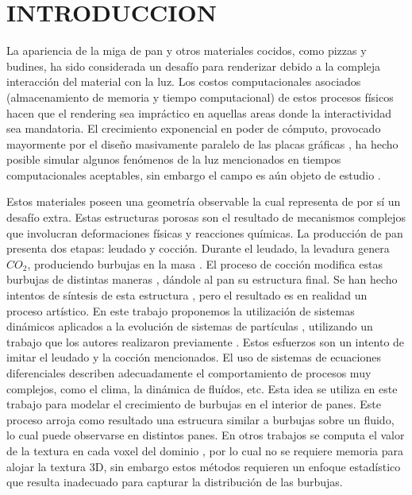\documentclass[oneside,a4paper,spanish,links]{amca}
\begin{document}
\section{INTRODUCCION}

La apariencia de la miga de pan y otros materiales cocidos, como pizzas y budines, ha sido considerada un desaf\'io para renderizar debido a la compleja interacci\'on del material con la luz. Los costos computacionales asociados (almacenamiento de memoria y tiempo computacional) de estos procesos f\'isicos hacen que el rendering sea impr\'actico en aquellas areas donde la interactividad sea mandatoria. El crecimiento exponencial en poder de c\'omputo, provocado mayormente por el dise\~no masivamente paralelo de las placas gr\'aficas \citep{Yeo09,Harris06}, ha hecho posible simular algunos fen\'omenos de la luz mencionados en tiempos computacionales aceptables, sin embargo el campo es a\'un objeto de estudio \citep{Voglsam2013}.

Estos materiales poseen una geometr\'ia observable la cual representa de por s\'i un desaf\'io extra. Estas estructuras porosas son el resultado de mecanismos complejos que involucran deformaciones f\'isicas y reacciones qu\'imicas. La producci\'on de pan presenta dos etapas: leudado y cocci\'on. Durante el leudado, la levadura genera $CO_{2}$, produciendo burbujas en la masa \citep{Shah1998}. El proceso de cocci\'on \citep{Mondal2008} modifica estas burbujas de distintas maneras \citep{Scanlon2001}, d\'andole al pan su estructura final. Se han hecho intentos de s\'intesis de esta estructura \citep{Cho2007}, pero el resultado es en realidad un proceso art\'istico. En este trabajo proponemos la utilizaci\'on de sistemas din\'amicos \citep{Strogatz2001} aplicados a la evoluci\'on de sistemas de part\'iculas \citep{Reeves83}, utilizando un trabajo que los autores realizaron previamente \citep{Baravalle2011}. Estos esfuerzos son un intento de imitar el leudado y la cocci\'on mencionados. El uso de sistemas de ecuaciones diferenciales describen adecuadamente el comportamiento de procesos muy complejos, como el clima, la dinámica de fluídos, etc. Esta idea se utiliza en este trabajo para modelar el crecimiento de burbujas en el interior de panes. Este proceso arroja como resultado una estrucura similar a burbujas sobre un fluido, lo cual puede observarse en distintos panes. En otros trabajos se computa el valor de la textura en cada voxel del dominio \citep{Perlin1989}, por lo cual no se requiere memoria para alojar la textura 3D, sin embargo estos m\'etodos requieren un enfoque estad\'istico que resulta inadecuado para capturar la distribuci\'on de las burbujas.
\end{document}
